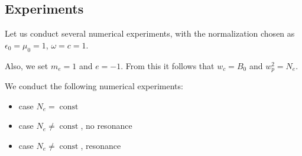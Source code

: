 \documentclass[a4paper,10pt]{article}
\begin{document}









\subsection{Experiments}
Let us conduct several numerical experiments, with the normalization chosen as $\epsilon_0=\mu_0=1$, $\omega=c=1$. 

Also, we set $m_e=1$ and $e=-1$. From this it follows that $w_c=B_0$ and $w_p^2=N_e$. 

We conduct the following numerical experiments:
\begin{itemize}
 \item case $N_e=\operatorname{const}$
 \item case $N_e\neq \operatorname{const}$, no resonance
 \item case $N_e\neq \operatorname{const}$, resonance
\end{itemize}
\end{document}
